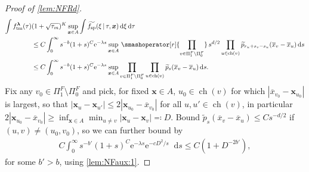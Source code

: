 \documentclass[reqno,draft]{amsart}
\numberwithin{equation}{section}
\theoremstyle{plain}
\theoremstyle{remark}
\newcommand*\diff{\mathop{}\!\mathrm{d}}
\newcommand{\e}{\mathrm{e}}
\DeclareMathOperator{\ch}{ch}
\newcommand{\fpart}{\Pi} %
\newcommand{\rfy}[1]{\widetilde{{#1}}} %
\newcommand{\ftm}{f_\mathrm{tm}^{\boldsymbol \lambda}}
\newcommand{\fsp}{f_\mathrm{sp}}
\newcommand{\interp}{\overline{x}} %
\begin{document}
\begin{proof}[Proof of \cref{lem:NFRd}]
    \begin{align*}
        \int \ftm(\tau) & (1+\sqrt{\tau_m} )^K \sup_{\boldsymbol x\in A} \int \rfy{\fsp}(\xi \,\vert\,\tau,\boldsymbol x)\diff \xi\diff \tau\\
                        &\le C \int_0^\infty  s^{-b} (1+ s)^C \e^{-\lambda s} \sup_{\boldsymbol x\in A}\,\smashoperator[r]{\prod_{v\in \fpart^F_1\setminus \fpart^F_{0}}}\,  s^{d / 2}\prod_{u\in\ch(v)}\rfy{p}_{r_u+ s_v- s_u}(\interp_v-\interp_u)\diff s\\
                        &\le C \int_0^\infty  s^{-b} (1+ s)^C \e^{-\lambda s} \sup_{\boldsymbol x\in A}\prod_{v\in \fpart^F_1\setminus \fpart^F_{0}}\prod_{u\in\ch(v)}\rfy{p}_s(\interp_v-\interp_u)\diff s.
    \end{align*}
    Fix any $v_0\in \fpart^F_1\setminus \fpart^F_0$ and pick, for fixed $\boldsymbol x\in A$, $u_0\in \ch(v)$ for which $|\interp_{v_0}-\boldsymbol x_{u_0}|$ is largest, so that $|\boldsymbol x_u - \boldsymbol x_{u'}| \le 2 |\boldsymbol x_{u_0}-\interp_{v_0}|$ for all $u,u'\in \ch(v)$, in particular $2|\boldsymbol x_{u_0}-\interp_{v_0}| \ge \inf_{\boldsymbol x\in A} \min_{u\neq v}|\boldsymbol x_u-\boldsymbol x_v| \eqqcolon D$. Bound $\rfy{p}_s(\interp_v - \interp_u) \le C s^{-d / 2}$ if $(u,v) \neq (u_0,v_0)$, so we can further bound by
    \begin{align}\label{eqprf:NFlem:2}
        C \int_0^\infty  s^{-b'} (1+ s)^C \e^{-\lambda  s} \e^{-c D^2 /  s } \diff  s \le C \left( 1 + D^{-2b'} \right) ,
    \end{align}
    for some $b' > b$, using \cref{lem:NFaux:1}.


\end{proof}
\end{document}
